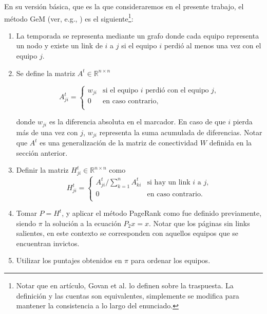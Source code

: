 \documentclass[11pt, a4paper]{article}
\begin{document}
En su versi\'on b\'asica, que es la que consideraremos en el presente trabajo, el m\'etodo GeM (ver, e.g., \cite[Secci\'on GeM Ranking Method]{Govan2008}) 
es el siguiente\footnote{Notar que en art\'iculo, Govan et al. \cite{Govan2008} lo definen sobre la traspuesta. La definici\'on y las cuentas son
equivalentes, simplemente se modifica para mantener la consistencia a lo largo del enunciado.}:
\begin{enumerate}
\item La temporada se representa mediante un grafo donde cada equipo representa un nodo y existe un link de $i$ a $j$ si el equipo $i$ perdi\'o al
menos una vez con el equipo $j$.
\item Se define la matriz $A^t \in \mathbb{R}^{n \times n}$

\begin{equation*}
A_{ji}^t = \left\{
	\begin{array}{cl}
	w_{ji} & \text{si el equipo } i \text{ perdi\'o con el equipo } j,\\
	0 & \text{en caso contrario, }\\
	\end{array} \right.
\end{equation*}

\noindent donde $w_{ji}$ es la diferencia absoluta en el marcador. En caso de que $i$ pierda m\'as de una vez con $j$, $w_{ji}$ representa la suma
acumulada de diferencias. Notar que $A^t$ es una generalizaci\'on de la matriz de conectividad $W$ definida en la secci\'on anterior.

\item Definir la matriz $H_{ji}^t \in \mathbb{R}^{n \times n}$ como
\begin{equation*}
H_{ji}^t = \left\{
	\begin{array}{cl}
	A_{ji}^t/\sum_{k = 1}^n A_{ki}^t & \text{si hay un link } i \text{ a } j,\\
	0 & \text{en caso contrario.}\\
	\end{array} \right.
\end{equation*}

\item Tomar $P = H^t$, y aplicar el m\'etodo PageRank como fue definido previamente, siendo $\pi$ la soluci\'on a la ecuaci\'on $P_2 x = x$. Notar que 
los p\'aginas sin links salientes, en este contexto se corresponden con aquellos equipos que se encuentran invictos.

\item Utilizar los puntajes obtenidos en $\pi$ para ordenar los equipos.
\end{enumerate}
\end{document}
